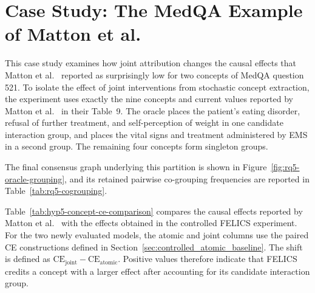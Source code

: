 \section{Case Study: The MedQA Example of Matton et al.}
\label{sec:results-motivating-example}

This case study examines how joint attribution changes the causal effects that Matton et al.~\cite{mattonWalkTalkMeasuring2024} reported as surprisingly low for two concepts of MedQA question 521. To isolate the effect of joint interventions from stochastic concept extraction, the experiment uses exactly the nine concepts and current values reported by Matton et al.~\cite{mattonWalkTalkMeasuring2024} in their Table~9. The oracle places the patient's eating disorder, refusal of further treatment, and self-perception of weight in one candidate interaction group, and places the vital signs and treatment administered by EMS in a second group. The remaining four concepts form singleton groups.

The final consensus graph underlying this partition is shown in
Figure~\ref{fig:rq5-oracle-grouping}, and its retained pairwise co-grouping
frequencies are reported in Table~\ref{tab:rq5-cogrouping}.

Table~\ref{tab:hyp5-concept-ce-comparison} compares the causal effects reported by Matton et al.~\cite{mattonWalkTalkMeasuring2024} with the effects obtained in the controlled FELICS experiment. For the two newly evaluated models, the atomic and joint columns use the paired CE constructions defined in Section~\ref{sec:controlled_atomic_baseline}. The shift is defined as $\mathrm{CE}_{\mathrm{joint}}-\mathrm{CE}_{\mathrm{atomic}}$. Positive values therefore indicate that FELICS credits a concept with a larger effect after accounting for its candidate interaction group.

